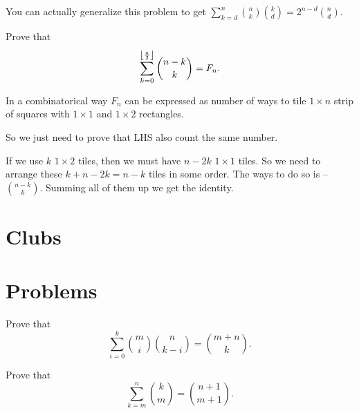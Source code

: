 You can actually generalize this problem to get $\displaystyle \sum_{k=d}^n\binom nk\binom kd=2^{n-d}\binom nd$.

\begin{example}
    Prove that \[\sum_{k=0}^{\left\lfloor \frac n2 \right\rfloor}\binom{n-k}k=F_n.\]
\end{example}

In a combinatorical way $F_n$ can be expressed as number of ways to tile $1\times n$ strip of squares with $1\times1$ and $1\times2$ rectangles.

So we just need to prove that LHS also count the same number.

If we use $k$ $1\times2$ tiles, then we must have $n-2k$ $1\times1$ tiles. So we need to arrange these $k+n-2k=n-k$ tiles in some order. The ways to do so is -- $\binom{n-k}k$. Summing all of them up we get the identity.

\section{Clubs}



\section{Problems}

\begin{problem}
    Prove that \[\sum_{i=0}^k\binom mi\binom n{k-i}=\binom{m+n}k.\]
\end{problem}

\begin{problem}
    Prove that \[\sum_{k=m}^n\binom km=\binom{n+1}{m+1}.\]
\end{problem}
